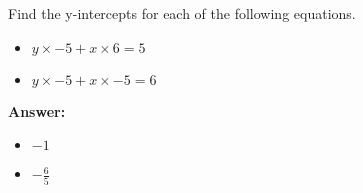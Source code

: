  Find the y-intercepts for each of the following equations. \begin{itemize}\item \( y \times -5 + x \times 6 = 5 \)\item \( y \times -5 + x \times -5 = 6 \)\end{itemize}

        \textbf{Answer:} \begin{itemize}\item \( -1 \)\item \( -\frac{6}{5} \)\end{itemize}
